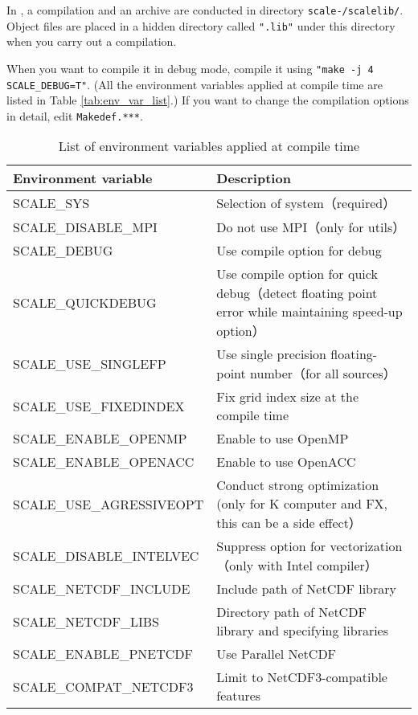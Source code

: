 In \scalelib, a compilation and an archive are conducted in directory \texttt{scale-{\version}/scalelib/}.
Object files are placed in a hidden directory called \verb|".lib"| under this directory when you carry out a compilation.

When you want to compile it in debug mode, compile it using \verb|"make -j 4 SCALE_DEBUG=T"|.
(All the environment variables applied at compile time are listed in Table \ref{tab:env_var_list}.)
If you want to change the compilation options in detail, edit \verb|Makedef.***|.

\begin{table}[htb]
\begin{center}
\caption{List of environment variables applied at compile time}
\begin{tabularx}{150mm}{|l|X|} \hline
 \rowcolor[gray]{0.9} Environment variable & Description \\ \hline
 SCALE\_SYS               & Selection of system（required）\\ \hline
 SCALE\_DISABLE\_MPI      & Do not use MPI（only for utils）\\ \hline
 SCALE\_DEBUG             & Use compile option for debug \\ \hline
 SCALE\_QUICKDEBUG        & Use compile option for quick debug（detect floating point error while maintaining speed-up option）\\ \hline
 SCALE\_USE\_SINGLEFP     & Use single precision floating-point number（for all sources）\\ \hline
 SCALE\_USE\_FIXEDINDEX   & Fix grid index size at the compile time \\ \hline
 SCALE\_ENABLE\_OPENMP    & Enable to use OpenMP \\ \hline
 SCALE\_ENABLE\_OPENACC   & Enable to use OpenACC \\ \hline
 SCALE\_USE\_AGRESSIVEOPT & Conduct strong optimization (only for K computer and FX, this can be a side effect）\\ \hline
 SCALE\_DISABLE\_INTELVEC & Suppress option for vectorization（only with Intel compiler）\\ \hline
 SCALE\_NETCDF\_INCLUDE   & Include path of NetCDF library \\ \hline
 SCALE\_NETCDF\_LIBS      & Directory path of NetCDF library and specifying libraries \\ \hline
 SCALE\_ENABLE\_PNETCDF   & Use Parallel NetCDF \\ \hline
 SCALE\_COMPAT\_NETCDF3   & Limit to NetCDF3-compatible features \\ \hline

\end{tabularx}
\end{center}
\end{table}
